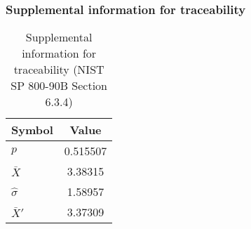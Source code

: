 \documentclass[a3paper,xelatex,english]{bxjsarticle}
\begin{document}
\subsubsection{Supplemental information for traceability}
\renewcommand{\arraystretch}{1.8}
\begin{table}[h]
\caption{Supplemental information for traceability (NIST SP 800-90B Section 6.3.4)}
\begin{center}
\begin{tabular}{|l|c|}
\hline 
\rowcolor{anotherlightblue} %
Symbol				& Value \\ \hline 
$p$				& 0.515507\\ \hline 
$\bar{X}$ 		&  3.38315\\ \hline
$\hat{\sigma}$		&  1.58957\\ \hline
$\bar{X}'$ 		&  3.37309\\ \hline
\end{tabular}
\end{center}
\end{table}
\renewcommand{\arraystretch}{1.4}
\clearpage
\end{document}
